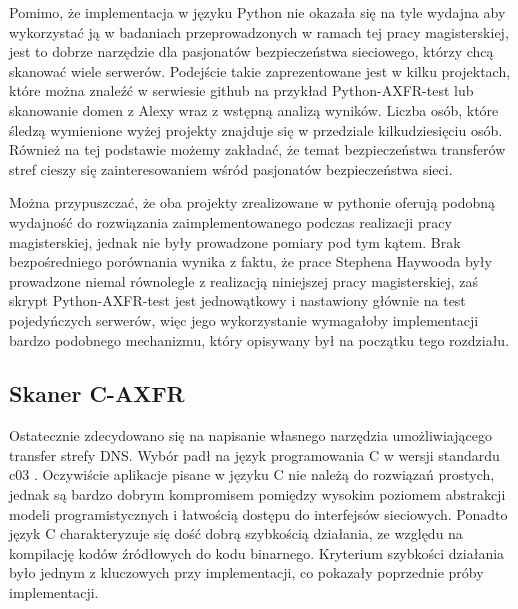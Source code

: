 Pomimo, że implementacja w języku Python nie okazała się na tyle wydajna aby wykorzystać ją w badaniach przeprowadzonych w ramach tej pracy magisterskiej, jest to dobrze narzędzie dla pasjonatów bezpieczeństwa sieciowego, którzy chcą skanować wiele serwerów. Podejście takie zaprezentowane jest w kilku projektach, które można znaleźć w serwiesie github na przykład Python-AXFR-test\cite{python_axfr_test} lub skanowanie domen z Alexy wraz z wstępną analizą wyników\cite{asg-axfr}. Liczba osób, które śledzą wymienione wyżej projekty znajduje się w przedziale kilkudziesięciu osób. Również na tej podstawie możemy zakładać, że temat bezpieczeństwa transferów stref cieszy się zainteresowaniem wśród pasjonatów bezpieczeństwa sieci.

Można przypuszczać, że oba projekty zrealizowane w pythonie \cite{python_axfr_test, asg-axfr} oferują podobną wydajność do rozwiązania zaimplementowanego podczas realizacji pracy magisterskiej, jednak nie były prowadzone pomiary pod tym kątem. Brak bezpośredniego porównania wynika z faktu, że prace Stephena Haywooda\cite{asg-axfr} były prowadzone niemal równolegle z realizacją niniejszej pracy magisterskiej, zaś skrypt Python-AXFR-test\cite{python-axfr-test} jest jednowątkowy i nastawiony głównie na test pojedyńczych serwerów, więc jego wykorzystanie wymagałoby implementacji bardzo podobnego mechanizmu, który opisywany był na początku tego rozdziału.

\subsection{Skaner C-AXFR}
Ostatecznie zdecydowano się na napisanie własnego narzędzia umożliwiającego transfer strefy DNS. Wybór padł na język programowania C \cite{clanguage} w wersji standardu c03 \cite{c03std}. Oczywiście aplikacje pisane w języku C nie należą do rozwiązań prostych, jednak są bardzo dobrym kompromisem pomiędzy wysokim poziomem abstrakcji modeli programistycznych i łatwością dostępu do interfejsów sieciowych. Ponadto język C charakteryzuje się dość dobrą szybkością działania, ze względu na kompilację kodów źródłowych do kodu binarnego. Kryterium szybkości działania było jednym z kluczowych przy implementacji, co pokazały poprzednie próby implementacji.

